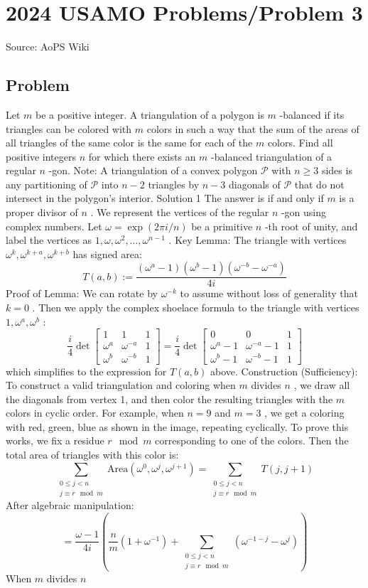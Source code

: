 \documentclass[12pt]{article}
\begin{document}
\section*{{2024 USAMO Problems/Problem 3}}
Source: AoPS Wiki

\subsection*{Problem}
Let $m$ be a positive integer. A triangulation of a polygon is $m$ -balanced if its triangles can be colored with $m$ colors in such a way that the sum of the areas of all triangles of the same color is the same for each of the $m$ colors. Find all positive integers $n$ for which there exists an $m$ -balanced triangulation of a regular $n$ -gon.
Note: A triangulation of a convex polygon $\mathcal{P}$ with $n \geq 3$ sides is any partitioning of $\mathcal{P}$ into $n-2$ triangles by $n-3$ diagonals of $\mathcal{P}$ that do not intersect in the polygon's interior. Solution 1 The answer is if and only if $m$ is a proper divisor of $n$ . We represent the vertices of the regular $n$ -gon using complex numbers. Let $\omega = \exp(2\pi i/n)$ be a primitive $n$ -th root of unity, and label the vertices as $1, \omega, \omega^2, \ldots, \omega^{n-1}$ . Key Lemma: The triangle with vertices $\omega^k, \omega^{k+a}, \omega^{k+b}$ has signed area: \[T(a, b) := \frac{(\omega^a - 1)(\omega^b - 1)(\omega^{-b} - \omega^{-a})}{4i}\] Proof of Lemma: We can rotate by $\omega^{-k}$ to assume without loss of generality that $k = 0$ . Then we apply the complex shoelace formula to the triangle with vertices $1, \omega^a, \omega^b$ : \[\frac{i}{4} \det \begin{bmatrix} 1 & 1 & 1 \\ \omega^a & \omega^{-a} & 1 \\ \omega^b & \omega^{-b} & 1 \end{bmatrix} = \frac{i}{4} \det \begin{bmatrix} 0 & 0 & 1 \\ \omega^a - 1 & \omega^{-a} - 1 & 1 \\ \omega^b - 1 & \omega^{-b} - 1 & 1 \end{bmatrix}\] which simplifies to the expression for $T(a, b)$ above. Construction (Sufficiency): To construct a valid triangulation and coloring when $m$ divides $n$ , we draw all the diagonals from vertex 1, and then color the resulting triangles with the $m$ colors in cyclic order. For example, when $n = 9$ and $m = 3$ , we get a coloring with red, green, blue as shown in the image, repeating cyclically. To prove this works, we fix a residue $r \mod m$ corresponding to one of the colors. Then the total area of triangles with this color is: \[\sum_{\substack{0 \leq j < n \\ j \equiv r \mod m}} \text{Area}(\omega^0, \omega^j, \omega^{j+1}) = \sum_{\substack{0 \leq j < n \\ j \equiv r \mod m}} T(j, j+1)\] After algebraic manipulation: \[= \frac{\omega - 1}{4i} \left(\frac{n}{m}(1 + \omega^{-1}) + \sum_{\substack{0 \leq j < n \\ j \equiv r \mod m}} (\omega^{-1-j} - \omega^j)\right)\] When $m$ divides $n$ 
\end{document}
